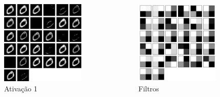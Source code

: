 \documentclass[tikz,10pt]{beamer}
\begin{document}
\begin{frame}
\begin{columns}
		\begin{column}{0.33\textwidth}
			\begin{figure}
				\includegraphics[height=4cm]{images/resultados/network_1/input_1_layer_activation_1}%
				\caption{Ativação 1}
			\end{figure}%
		\end{column}
		\begin{column}{0.33\textwidth}
			\begin{figure}
				\includegraphics[height=4cm]{images/resultados/network_1/filter_convolution2d_2}%
				\caption{Filtros}			
			\end{figure}%
		\end{column}	
	\end{columns}
	
\end{frame}
\end{document}

